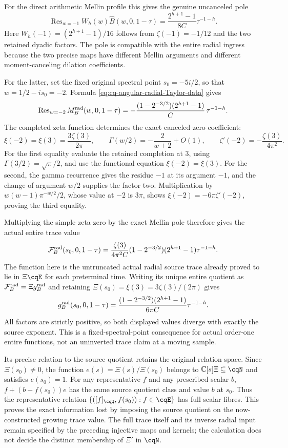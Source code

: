 For the direct arithmetic Mellin profile this gives the genuine
uncanceled pole
\[
 \operatorname{Res}_{w=-1}W_h(w)\widehat B(w,0,1-\tau)
       =\frac{2^{h+1}-1}{8C}\tau^{-1-h}.
\]
Here $W_h(-1)=(2^{h+1}-1)/16$ follows from
$\zeta(-1)=-1/12$ and the two retained dyadic factors.
The pole is compatible with the entire radial ingress because
the two precise maps have different Mellin arguments and
different moment-canceling dilation coefficients.

For the latter, set the fixed original spectral point
$s_0=-5i/2$, so that $w=1/2-is_0=-2$.
Formula \eqref{eq:cq-angular-radial-Taylor-data} gives
\[
 \operatorname{Res}_{w=-2}M_B^{\rm rad}(w,0,1-\tau)
   =-\frac{(1-2^{-3/2})(2^{h+1}-1)}C\,\tau^{-1-h}.
\]
The completed zeta function determines the exact canceled
zero coefficient:
\[
 \xi(-2)=\xi(3)=\frac{3\zeta(3)}{2\pi},\qquad
 \Gamma(w/2)=-\frac2{w+2}+O(1),\qquad
 \zeta'(-2)=-\frac{\zeta(3)}{4\pi^2}.
\]
For the first equality evaluate the retained completion at
$3$, using $\Gamma(3/2)=\sqrt\pi/2$, and use the functional
equation $\xi(-2)=\xi(3)$. For the second, the gamma recurrence
gives the residue $-1$ at its argument $-1$, and the change
of argument $w/2$ supplies the factor two. Multiplication by
$w(w-1)\pi^{-w/2}/2$, whose value at $-2$ is $3\pi$, shows
$\xi(-2)=-6\pi\zeta'(-2)$, proving the third equality.

Multiplying the simple zeta zero by the exact Mellin pole
therefore gives the actual entire trace value
\begin{equation}
 \mathcal F_B^{\rm rad}(s_0,0,1-\tau)
 =\frac{\zeta(3)}{4\pi^2C}
       (1-2^{-3/2})(2^{h+1}-1)\tau^{-1-h}.
 \label{eq:cq-actual-entire-trace-fixed-value}
\end{equation}
The function here is the untruncated actual radial source trace
already proved to lie in $\Xi\cqE$ for each preterminal time.
Writing its unique entire quotient as
$\mathcal F_B^{\rm rad}=\Xi g_B^{\rm rad}$ and retaining
$\Xi(s_0)=\xi(3)=3\zeta(3)/(2\pi)$ gives
\begin{equation}
 g_B^{\rm rad}(s_0,0,1-\tau)
 =\frac{(1-2^{-3/2})(2^{h+1}-1)}{6\pi C}\tau^{-1-h}.
 \label{eq:cq-actual-entire-quotient-fixed-value}
\end{equation}
All factors are strictly positive, so both displayed values
diverge with exactly the source exponent. This is a
fixed-spectral-point consequence for actual order-one entire
functions, not an uninverted trace claim at a moving sample.

Its precise relation to the source quotient retains the original
relation space. Since $\Xi(s_0)\ne0$, the function
$e(s)=\Xi(s)/\Xi(s_0)$ belongs to
$\mathbb C[s]\Xi\subseteq\cqN$ and satisfies $e(s_0)=1$.
For any representative $f$ and any prescribed scalar $b$,
$f+(b-f(s_0))e$ has the same source quotient class and
value $b$ at $s_0$. Thus the representative relation
$\{([f]_{\cqQ},f(s_0)):f\in\cqE\}$ has full scalar fibres.
This proves the exact information lost by imposing the source
quotient on the now-constructed growing trace value.
The full trace itself and its inverse radial input remain
specified by the preceding injective maps and kernels;
the calculation does not decide the distinct membership of
$\Xi'$ in $\cqN$.
